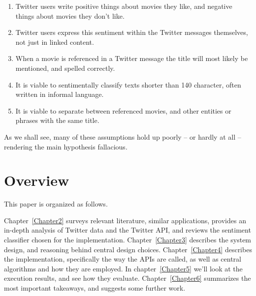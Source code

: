 \begin{enumerate}
  \item Twitter users write positive things about movies they like, and negative things about movies they don't like.
  \item Twitter users express this sentiment within the Twitter messages themselves, not just in linked content.
  \item When a movie is referenced in a Twitter message the title will most likely be mentioned, and spelled correctly.
  \item It is viable to sentimentally classify texts shorter than 140 character, often written in informal language.
  \item It is viable to separate between referenced movies, and other entities or phrases with the same title.
\end{enumerate}

As we shall see, many of these assumptions hold up poorly -- or hardly at all -- rendering the main hypothesis fallacious.


\section{Overview}

This paper is organized as follows.

Chapter~\ref{Chapter2} surveys relevant literature, similar applications, provides an in-depth analysis of Twitter data and the Twitter API, and reviews the sentiment classifier chosen for the implementation.
Chapter~\ref{Chapter3} describes the system design, and reasoning behind central design choices.
Chapter~\ref{Chapter4} describes the implementation, specifically the way the APIs are called, as well as central algorithms and how they are employed.
In chapter~\ref{Chapter5} we'll look at the execution results, and see how they evaluate.
Chapter~\ref{Chapter6} summarizes the most important takeaways, and suggests some further work.

